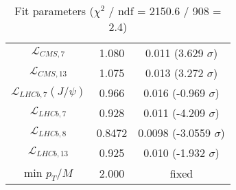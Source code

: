 \begin{table}[h!]
\begin{tabular}{c|c|c}
$\mathcal L_{CMS,7}$ & 1.080 & 0.011 (3.629 $\sigma$) \\
$\mathcal L_{CMS,13}$ & 1.075 & 0.013 (3.272 $\sigma$) \\
$\mathcal L_{LHCb,7}(J/\psi)$ & 0.966 & 0.016 (-0.969 $\sigma$) \\
$\mathcal L_{LHCb,7}$ & 0.928 & 0.011 (-4.209 $\sigma$) \\
$\mathcal L_{LHCb,8}$ & 0.8472 & 0.0098 (-3.0559 $\sigma$) \\
$\mathcal L_{LHCb,13}$ & 0.925 & 0.010 (-1.932 $\sigma$) \\
min $p_T/M$ & 2.000 & fixed \\
\end{tabular}
\caption{Fit parameters ($\chi^2$ / ndf = 2150.6 / 908 = 2.4)}
\end{table}
